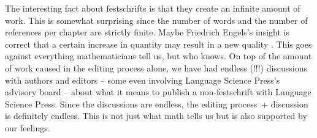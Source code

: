 \documentclass[output=paper,colorlinks,citecolor=brown]{langscibook}
\begin{document}
The interesting fact about festschrifts is that they create an infinite amount of work. This is somewhat
surprising since the number of words and the number of references per chapter are strictly
finite. Maybe Friedrich Engels's insight is correct that a certain increase in quantity may result in a new
quality \citep[]{Engels1873a-u}. This goes against everything mathematicians tell us, but who knows.
On top of the amount of work caused in the editing process alone, we have had endless (!!!) discussions
with authors and editors -- some even involving Language Science Press's advisory board -- about what it means to publish a non-festschrift with Language Science
Press. Since the discussions are endless, the editing process~+ discussion is definitely endless. This
is not just what math tells us but is also supported by our feelings.
\end{document}
